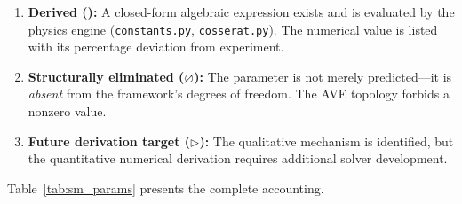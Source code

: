 \begin{enumerate}
    \item \textbf{Derived (\checkmark):} A closed-form algebraic expression
          exists and is evaluated by the physics engine
          (\texttt{constants.py}, \texttt{cosserat.py}). The numerical value
          is listed with its percentage deviation from experiment.
    \item \textbf{Structurally eliminated ($\varnothing$):} The parameter
          is not merely predicted---it is \textit{absent} from the framework's
          degrees of freedom. The AVE topology forbids a nonzero value.
    \item \textbf{Future derivation target ($\triangleright$):} The
          qualitative mechanism is identified, but the quantitative numerical
          derivation requires additional solver development.
\end{enumerate}

\noindent
Table~\ref{tab:sm_params} presents the complete accounting.

